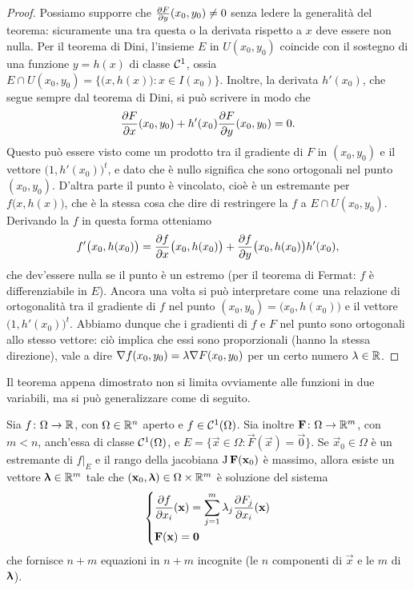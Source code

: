 \begin{proof}
	Possiamo supporre che $\frac{\partial {F}}{\partial {y}}(x_0,y_0)\neq 0$ senza ledere la generalità del teorema: sicuramente una tra questa o la derivata rispetto a $x$ deve essere non nulla.
	Per il teorema di Dini, l'insieme $E$ in $U(x_0,y_0)$ coincide con il sostegno di una funzione $y=h(x)$ di classe $\mathcal{C}^{{1}}$, ossia $E\cap U(x_0,y_0)=\{\big(x,h(x)\big)\colon x\in I(x_0)\}$.
	Inoltre, la derivata $h'(x_0)$, che segue sempre dal teorema di Dini, si può scrivere in modo che
	\begin{equation}
		\frac{\partial {F}}{\partial {x}}(x_0,y_0)+h'(x_0)\frac{\partial {F}}{\partial {y}}(x_0,y_0)=0.
	\end{equation}
	Questo può essere visto come un prodotto tra il gradiente di $F$ in $(x_0,y_0)$ e il vettore $\big(1,h'(x_0)\big)^t$, e dato che è nullo significa che sono ortogonali nel punto $(x_0,y_0)$.
	D'altra parte il punto è vincolato, cioè è un estremante per $f\big(x,h(x)\big)$, che è la stessa cosa che dire di restringere la $f$ a $E\cap U(x_0,y_0)$.
	Derivando la $f$ in questa forma otteniamo
	\begin{equation}
		f'\big(x_0,h(x_0)\big)=\frac{\partial {f}}{\partial {x}}\big(x_0,h(x_0)\big)+\frac{\partial {f}}{\partial {y}}\big(x_0,h(x_0)\big)h'(x_0),
	\end{equation}
	che dev'essere nulla se il punto è un estremo (per il teorema di Fermat: $f$ è differenziabile in $E$).
	Ancora una volta si può interpretare come una relazione di ortogonalità tra il gradiente di $f$ nel punto $(x_0,y_0)=\big(x_0,h(x_0)\big)$ e il vettore $\big(1,h'(x_0)\big)^t$.
	Abbiamo dunque che i gradienti di $f$ e $F$ nel punto sono ortogonali allo stesso vettore: ciò implica che essi sono proporzionali (hanno la stessa direzione), vale a dire $\nabla f(x_0,y_0)=\lambda\nabla F(x_0,y_0)$ per un certo numero $\lambda\in\mathbb{R}$.
\end{proof}
Il teorema appena dimostrato non si limita ovviamente alle funzioni in due variabili, ma si può generalizzare come di seguito.
\begin{teorema} \label{t:moltiplicatori-lagrange}
	Sia $f\colon\Omega\to\mathbb{R}$, con $\Omega\in\mathbb{R}^n$ aperto e $f\in\mathcal{C}^{{1}}(\Omega)$. Sia inoltre $\mathbf{F}\colon\Omega\to\mathbb{R}^m$, con $m<n$, anch'essa di classe $\mathcal{C}^{{1}}(\Omega)$, e $E=\{\vec x\in\Omega\colon\vec F(\vec x)=\vec 0\}$.
	Se $\vec x_0\in\Omega$ è un estremante di $f|_E$ e il rango della jacobiana $\operatorname{J}\mathbf{F}(\mathbf{x}_0)$ è massimo, allora esiste un vettore $\bm{\uplambda}\in\mathbb{R}^m$ tale che $(\mathbf{x}_0,\bm{\uplambda})\in\Omega\times\mathbb{R}^m$ è soluzione del sistema
	\begin{equation} 
		\begin{dcases}
			\frac{\partial {f}}{\partial {x_i}}(\mathbf{x})=\sum_{j=1}^m\lambda_j\frac{\partial {F_j}}{\partial {x_i}}(\mathbf{x})\\
			\mathbf{F}(\mathbf{x})=\mathbf{0}
		\end{dcases}
		\label{eq:moltiplicatori-lagrange}
	\end{equation}
	che fornisce $n+m$ equazioni in $n+m$ incognite (le $n$ componenti di $\vec x$ e le $m$ di $\bm{\uplambda}$).
\end{teorema}
